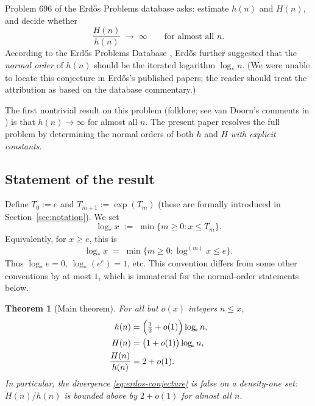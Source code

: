 \documentclass[11pt,reqno]{amsart}
\theoremstyle{plain}
\newtheorem{theorem}{Theorem}[section]
\theoremstyle{definition}
\newcommand{\logstar}{\log_{\!*}}
\begin{document}
Problem 696 of the Erd\H{o}s Problems database \cite{ErdosProblems696} asks: estimate
$h(n)$ and $H(n)$, and decide whether
\begin{equation}\label{eq:erdos-conjecture}
\frac{H(n)}{h(n)} \;\longrightarrow\; \infty
\qquad\text{for almost all }n.
\end{equation}
According to the Erd\H{o}s Problems Database \cite{ErdosProblems696}, Erd\H{o}s
further suggested that the \emph{normal order} of $h(n)$ should be the iterated
logarithm $\logstar n$. (We were unable to locate this conjecture in
Erd\H{o}s's published papers; the reader should treat the attribution as based
on the database commentary.)

The first nontrivial result on this problem (folklore; see van Doorn's comments
in \cite{ErdosProblems696}) is that $h(n)\to\infty$ for almost all $n$. The
present paper resolves the full problem by determining the normal orders of
both $h$ and $H$ \emph{with explicit constants}.

\subsection{Statement of the result}\label{ss:main-result}

Define $T_0:=e$ and $T_{m+1}:=\exp(T_m)$ (these are formally introduced in
Section~\ref{sec:notation}). We set
\begin{equation}\label{eq:logstar-def}
\logstar x \;:=\; \min\{m\ge 0 : x\le T_m\}.
\end{equation}
Equivalently, for $x\ge e$, this is
\[
\logstar x \;=\; \min\{m\ge 0 : \log^{(m)} x \le e\}.
\]
Thus $\logstar e=0$, $\logstar(e^e)=1$, etc. This convention differs from
some other conventions by at most $1$, which is immaterial for the
normal-order statements below.

\begin{theorem}[Main theorem]\label{thm:main}
For all but $o(x)$ integers $n\le x$,
\begin{align}
h(n) &= \Bigl(\tfrac12 + o(1)\Bigr)\logstar n, \label{eq:h-normal}\\
H(n) &= \bigl(1 + o(1)\bigr)\logstar n, \label{eq:H-normal}\\
\frac{H(n)}{h(n)} &= 2 + o(1). \label{eq:ratio}
\end{align}
In particular, the divergence \eqref{eq:erdos-conjecture} is false on a
density-one set: $H(n)/h(n)$ is bounded above by $2+o(1)$ for almost all $n$.
\end{theorem}
\end{document}
